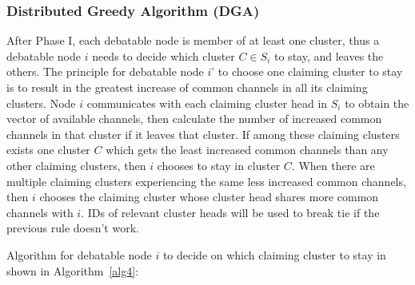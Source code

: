 
\subsubsection{Distributed Greedy Algorithm (DGA)}
After Phase I, each debatable node is member of at least one cluster, thus a debatable node $i$ needs to decide which cluster $C\in S_i$ to stay, and leaves the others.
The principle for debatable node $i$' to choose one claiming cluster to stay is to result in the greatest increase of common channels in all its claiming clusters.
Node $i$ communicates with each claiming cluster head in $S_i$ to obtain the vector of available channels, then calculate the number of increased common channels in that cluster if it leaves that cluster.
If among these claiming clusters exists one cluster $C$ which gets the least increased common channels than any other claiming clusters, then $i$ chooses to stay in cluster $C$.
When there are multiple claiming clusters experiencing the same less increased common channels, then $i$ chooses the claiming cluster whose cluster head shares more common channels with $i$.
IDs of relevant cluster heads will be used to break tie if the previous rule doesn't work.

Algorithm for debatable node $i$ to decide on which claiming cluster to stay in shown in Algorithm~\ref{alg4}:

